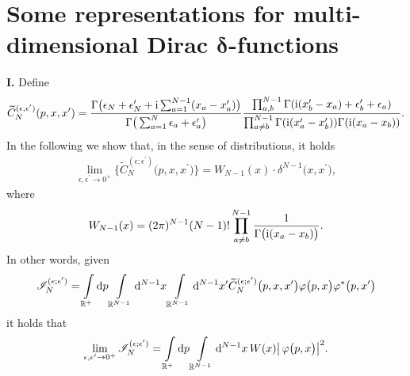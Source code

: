 \appendix

\section[Some representations for multi-dimensional Dirac delta-functions]
{Some representations for multi-dimensional Dirac $\boldsymbol{\delta}$-functions}
\label{Appendix identite fct delat evoluee}

{\bf I.} Define
\begin{gather*}
\widetilde C_N^{( \epsilon, \epsilon')}(p, x, x')=
\frac{\Gamma\big(
\epsilon_N+\epsilon'_N+{\rm i}\sum_{a=1}^{N-1}(x_a-x'_a)\big)}{\Gamma\big(\sum_{a=1}^N\epsilon_a+\epsilon'_a\big) }
 \frac{ \prod_{ a, b }^{ N-1 }\Gamma({\rm i}(x'_b-x_a)+\epsilon'_b+\epsilon_a)}{ \prod_{ a \not= b }^{ N-1 }
\Gamma( {\rm i} (x_{a}^{\prime}-x_{b}^{\prime})) \Gamma( {\rm i} (x_{a}-x_{b})) }.
\end{gather*}
In the following we show that, in the sense of distributions, it holds
\begin{gather*}
\lim_{\epsilon, \epsilon^{\prime} \rightarrow 0^+ } \big\{ \widetilde{C}_N^{(\epsilon;\epsilon^{\prime})}\big(p,x,x^{\prime} \big) \big\}
= W_{N-1}(x) \cdot \delta^{N-1}\big(x,x^{\prime} \big),
\end{gather*}
where
\begin{gather}\label{W-N-def}
W_{N-1}(x) = (2\pi)^{N-1} (N-1)! \prod\limits_{a\not=b}^{N-1} \frac{1}{ \Gamma\big({\rm i} (x_{a}-x_{b}) \big) }.
\end{gather}
In other words, given
\begin{gather}
\mathscr{I}_N^{(\epsilon;\epsilon^{\prime})} = \int\limits_{\mathbb{R}^+}{} {\rm d}p \int\limits_{\mathbb{R}^{N-1}}{}
{\rm d}^{N-1}x \int\limits_{\mathbb{R}^{N-1}}{} {\rm d}^{N-1}x^{\prime}
\widetilde{C}_N^{(\epsilon;\epsilon^{\prime})}\big(p,x,x^{\prime} \big)
\varphi\big(p,x\big)\varphi^{*}\big(p,x^{\prime}\big)
\label{equation definition msc IN}
\end{gather}
it holds that
\begin{gather*}
\lim_{\epsilon, \epsilon^{\prime} \rightarrow 0^+ } \mathscr{I}_N^{(\epsilon;\epsilon^{\prime})}
=
 \int\limits_{\mathbb{R}^+}{} {\rm d}p \int\limits_{\mathbb{R}^{N-1}}{} {\rm d}^{N-1}x\, W(x) \big| \,\varphi\big(p,x\big) \big|^2 .
\end{gather*}

